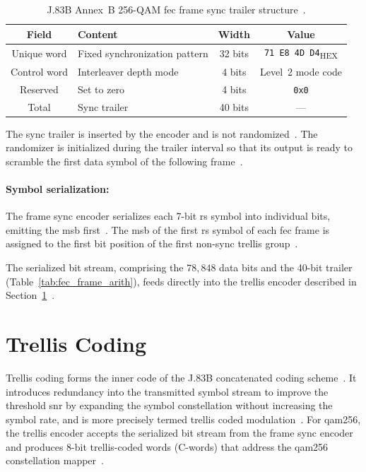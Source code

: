 \begin{table}[htbp]
  \caption{J.83B Annex~B 256-QAM \ac{fec} frame sync trailer
           structure~\cite{ITU_J83}.}
  \label{tab:framesync_trailer}
  \centering
  \begin{tabular}{clcc}
    \hline
    Field & Content & Width & Value \\
    \hline
    Unique word  & Fixed synchronization pattern & 32 bits
                 & \texttt{71 E8 4D D4}\textsubscript{HEX} \\
    Control word & Interleaver depth mode        & 4 bits
                 & Level~2 mode code \\
    Reserved     & Set to zero                   & 4 bits
                 & \texttt{0x0} \\
    \hline
    Total        & Sync trailer                  & 40 bits & --- \\
    \hline
  \end{tabular}
\end{table}

The sync trailer is inserted by the encoder and is not
randomized~\cite{ITU_J83}.
The randomizer is initialized during the trailer interval so that
its output is ready to scramble the first data symbol of the
following frame~\cite{ITU_J83}.

\paragraph{Symbol serialization:}
The frame sync encoder serializes each 7-bit \ac{rs} symbol into
individual bits, emitting the \ac{msb} first~\cite{ITU_J83}.
The \ac{msb} of the first \ac{rs} symbol of each \ac{fec} frame is
assigned to the first bit position of the first non-sync trellis
group~\cite{ITU_J83}.

The serialized bit stream, comprising the $78{,}848$ data bits and
the 40-bit trailer (Table~\ref{tab:fec_frame_arith}), feeds
directly into the trellis encoder described in
Section~\ref{sec:trellis}~\cite{ITU_J83}.


\section{Trellis Coding}
\label{sec:trellis}

Trellis coding forms the inner code of the J.83B concatenated
coding scheme~\cite{ITU_J83}.
It introduces redundancy into the transmitted symbol stream to
improve the threshold \ac{snr} by expanding the symbol
constellation without increasing the symbol rate, and is more
precisely termed trellis coded modulation~\cite{ITU_J83}.
For \ac{qam256}, the trellis encoder accepts the serialized bit
stream from the frame sync encoder and produces 8-bit
trellis-coded words (C-words) that address the \ac{qam256}
constellation mapper~\cite{ITU_J83}.


